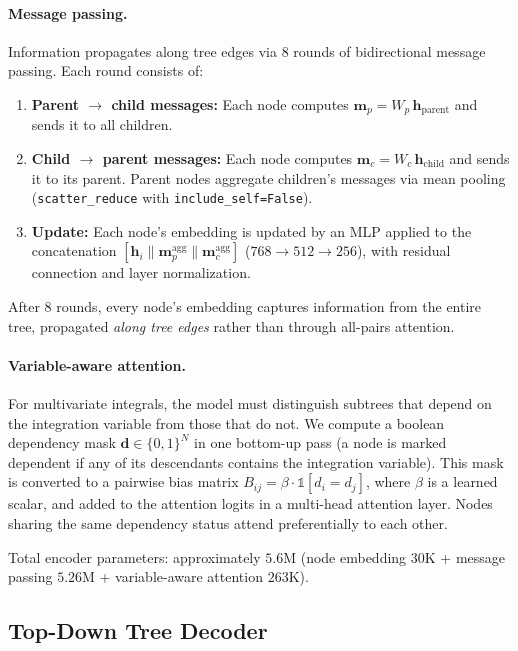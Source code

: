 \documentclass{article}
\begin{document}
\paragraph{Message passing.} Information propagates along tree edges via
$8$ rounds of bidirectional message passing. Each round consists of:
\begin{enumerate}
	\item \textbf{Parent $\to$ child messages:} Each node computes
	      $\mathbf{m}_p = W_p\,\mathbf{h}_{\text{parent}}$ and sends it to all
	      children.
	\item \textbf{Child $\to$ parent messages:} Each node computes
	      $\mathbf{m}_c = W_c\,\mathbf{h}_{\text{child}}$ and sends it to its
	      parent. Parent nodes aggregate children's messages via mean pooling
	      (\texttt{scatter\_reduce} with \texttt{include\_self=False}).
	\item \textbf{Update:} Each node's embedding is updated by an MLP applied
	      to the concatenation
	      $[\mathbf{h}_i\!\|\!\mathbf{m}_p^{\text{agg}}\!\|\!\mathbf{m}_c^{\text{agg}}]$
	      ($768 \to 512 \to 256$), with residual connection and layer
	      normalization.
\end{enumerate}
After $8$ rounds, every node's embedding captures information from the
entire tree, propagated \emph{along tree edges} rather than through
all-pairs attention.

\paragraph{Variable-aware attention.} For multivariate integrals, the model
must distinguish subtrees that depend on the integration variable from
those that do not. We compute a boolean dependency mask
$\mathbf{d} \in \{0,1\}^N$ in one bottom-up pass (a node is marked
dependent if any of its descendants contains the integration variable).
This mask is converted to a pairwise bias matrix
$B_{ij} = \beta \cdot \mathbb{1}[d_i = d_j]$, where $\beta$ is a learned
scalar, and added to the attention logits in a multi-head attention layer.
Nodes sharing the same dependency status attend preferentially to each
other.

Total encoder parameters: approximately $5.6$M
(node embedding $30$K + message passing $5.26$M + variable-aware
attention $263$K).


\subsection{Top-Down Tree Decoder}
\label{sec:decoder}
\end{document}
